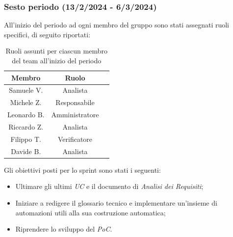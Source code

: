 \subsubsection{Sesto periodo (13/2/2024 - 6/3/2024)}
All'inizio del periodo ad ogni membro del gruppo sono stati assegnati ruoli specifici, di seguito riportati:
\begin{table}[H]
\centering
\begin{tabular}{|c|c|c|}
\hline
\textbf{Membro} & \textbf{Ruolo} \\
\hline
Samuele V. & Analista \\
\hline
Michele Z. & Responsabile \\
\hline
Leonardo B. & Amministratore \\
\hline
Riccardo Z. & Analista \\
\hline
Filippo T. & Verificatore \\
\hline
Davide B. & Analista \\
\hline
\end{tabular}
\caption{Ruoli assunti per ciascun membro del team all'inizio del periodo}
\end{table}

Gli obiettivi posti per lo sprint sono stati i seguenti:
\begin{itemize}
    \item Ultimare gli ultimi \emph{UC} e il documento di \emph{Analisi dei Requisiti};
    \item Iniziare a redigere il glossario tecnico e implementare un'insieme di automazioni utili alla sua costruzione automatica;
    \item Riprendere lo sviluppo del \emph{PoC}.
\end{itemize}


